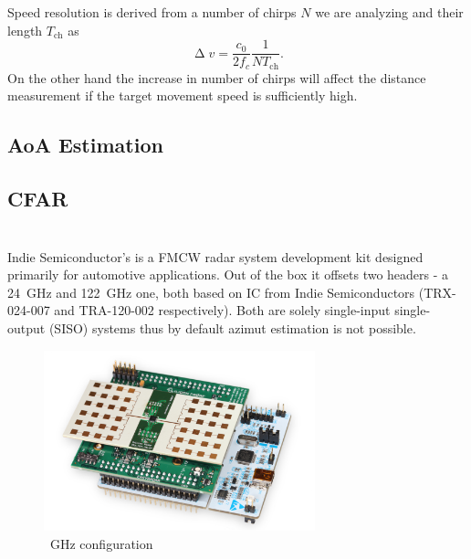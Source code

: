 Speed resolution is derived from a number of chirps $N$ we are analyzing and their length $T_{\mathrm{ch}}$ as
\begin{equation}
	\upDelta v = \frac{c_0}{2f_c} \frac{1}{NT_{\mathrm{ch}}}.
	\label{eq:doppler3}
\end{equation}
On the other hand the increase in number of chirps will affect the distance measurement if the target movement speed is sufficiently high.


\section{AoA Estimation}


\section{CFAR}




\chapter{\sidar}

Indie Semiconductor's \sidar is a FMCW radar system development kit designed primarily for automotive applications.
Out of the box it offsets two headers - a 24~GHz and 122~GHz one, both based on IC from Indie Semiconductors (TRX-024-007 and TRA-120-002 respectively).
Both  are solely single-input single-output (SISO) systems thus by default azimut estimation is not possible.

\begin{figure}[h!]
	\centering
	\includegraphics[width=0.7\textwidth]{../img/sidar.png}

	\caption[\sidar, Downloaded from: \url{https://wiki.ffo.indiesemi.com/wiki/images/2/29/Figure_2_24_GHz_configuration.png} on \[2024-12-28\]]{~GHz configuration}
	\label{fig:sidar}
\end{figure}


